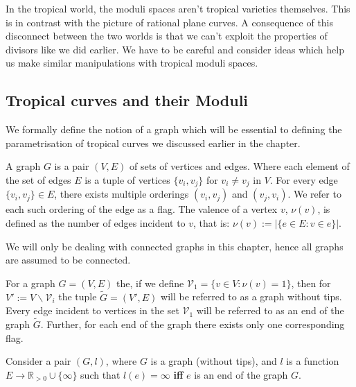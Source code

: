 \par In the tropical world, the moduli spaces aren't tropical varieties themselves. 
This is in contrast with the picture of rational plane curves.
A consequence of this disconnect between the two worlds is that we can't exploit the properties of divisors like we did earlier.
We have to be careful and consider ideas which help us make similar manipulations with tropical moduli spaces.

\subsection{Tropical curves and their Moduli}

We formally define the notion of a graph which will be essential to defining the parametrisation of tropical curves we discussed earlier in the chapter.

\begin{definition}[Graphs]
    A graph $G$ is a pair $(V,E)$ of sets of vertices and edges.
    Where each element of the set of edges $E$ is a tuple of vertices $\{v_{i},v_{j}\}$ for $v_{i} \neq v_{j}$ in $V$. 
    For every edge $\{v_{i},v_{j}\} \in E$, there exists multiple orderings $(v_{i},v_{j})$ and $(v_{j},v_{i})$. We refer to each such ordering of the edge as a flag.
    The valence of a vertex $v$, $\nu(v)$, is defined as the number of edges incident to $v$, that is: $\nu(v):=|\{e \in E: v\in e\}|$.
\end{definition}

\begin{remark}
    We will only be dealing with connected graphs in this chapter, hence all graphs are assumed to be connected.
\end{remark}

\begin{definition}
    For a graph $G = (V,E)$ the, if we define $\mathcal{V}_{1} = \{v \in V: \nu(v) =1  \}$, then for $V':= V\backslash \mathcal{V}_{i}$ the tuple $\tilde{G} = (V',E)$ will be referred to as a graph without tips. 
    Every edge incident to vertices in the set $\mathcal{V}_{1}$ will be referred to as an end of the graph $\tilde G$.
    Further, for each end of the graph there exists only one corresponding flag.
\end{definition}


\begin{definition}
    Consider a pair $(G,l)$, where $G$ is a graph (without tips), and $l$ is a function $E \to \mathbb{R}_{>0} \cup \{\infty\}$ such that $l(e) = \infty$ \textbf{iff} $e$ is an end of the graph $G$.
\end{definition}

